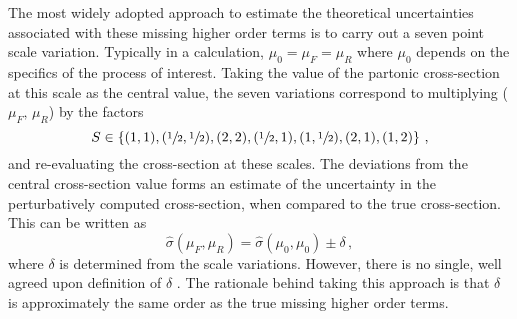 \documentclass[main.tex]{subfiles}
\begin{document}
    The most widely adopted approach to estimate the
    theoretical uncertainties associated with these
    missing higher order terms is to carry out a seven point
    scale variation. Typically in a calculation,
    $\mu_{0} = \mu_{F} = \mu_{R}$ where $\mu_{0}$ depends on the specifics
    of the process of interest. Taking the value of the
    partonic cross-section at this scale as the central value,
    the seven variations correspond to multiplying ($\mu_{F}, \, \mu_{R}$) by the factors 
    \begin{equation}\label{eqn:scale_variations}
        S \in \left\{(1, 1), (\sfrac{1}{2}, \sfrac{1}{2}), (2, 2), (\sfrac{1}{2}, 1), (1, \sfrac{1}{2}), (2, 1), (1, 2) \right\} \, ,
    \end{equation}
    and re-evaluating the cross-section at these scales.
    The deviations from the central cross-section value
    forms an estimate of the uncertainty in the perturbatively
    computed cross-section, when compared to the true cross-section.
    This can be written as
    \begin{equation}
        \hat{\sigma}(\mu_{F}, \mu_{R}) = \hat{\sigma}(\mu_{0}, \mu_{0}) \pm \delta \, ,
    \end{equation}
    where $\delta$ is determined from the scale variations.
    However, there is no single, well agreed upon definition
    of $\delta$ \cite{Cacciari:2011ze}.
    The rationale behind taking this approach is that $\delta$
    is approximately the same order as the true missing
    higher order terms.
\end{document}
